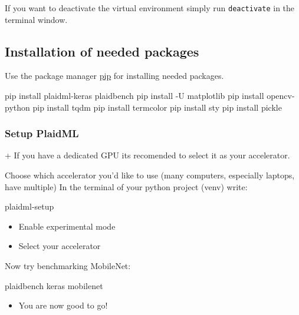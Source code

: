 \documentclass[
]{article}
\newenvironment{Shaded}{}{}
\newcommand{\ExtensionTok}[1]{#1}
\newcommand{\NormalTok}[1]{#1}
\newcommand{\VariableTok}[1]{\textcolor[rgb]{0.10,0.09,0.49}{#1}}
\providecommand{\tightlist}{%
  \setlength{\itemsep}{0pt}\setlength{\parskip}{0pt}}
\begin{document}
If you want to deactivate the virtual environment simply run
\texttt{deactivate} in the terminal window.

\hypertarget{installation-of-needed-packages}{%
\subsection{Installation of needed
packages}\label{installation-of-needed-packages}}

Use the package manager \href{https://pip.pypa.io/en/stable/}{pip} for
installing needed packages.

\begin{Shaded}
\begin{Highlighting}[]
\ExtensionTok{pip}\NormalTok{ install plaidml{-}keras plaidbench}
\ExtensionTok{pip}\NormalTok{ install {-}U matplotlib}
\ExtensionTok{pip}\NormalTok{ install opencv{-}python}
\ExtensionTok{pip}\NormalTok{ install tqdm}
\ExtensionTok{pip}\NormalTok{ install termcolor}
\ExtensionTok{pip}\NormalTok{ install sty}
\ExtensionTok{pip}\NormalTok{ install pickle}
\end{Highlighting}
\end{Shaded}

\hypertarget{setup-plaidml}{%
\subsubsection{Setup PlaidML}\label{setup-plaidml}}

\begin{Shaded}
\begin{Highlighting}[]
\VariableTok{+ If you have a dedicated GPU its recomended to select it as your accelerator.}
\end{Highlighting}
\end{Shaded}

Choose which accelerator you'd like to use (many computers, especially
laptops, have multiple) In the terminal of your python project (venv)
write:

\begin{Shaded}
\begin{Highlighting}[]
\ExtensionTok{plaidml{-}setup}
\end{Highlighting}
\end{Shaded}

\begin{itemize}
\tightlist
\item
  Enable experimental mode
\item
  Select your accelerator
\end{itemize}

Now try benchmarking MobileNet:

\begin{Shaded}
\begin{Highlighting}[]
\ExtensionTok{plaidbench}\NormalTok{ keras mobilenet}
\end{Highlighting}
\end{Shaded}

\begin{itemize}
\tightlist
\item
  You are now good to go!
\end{itemize}
\end{document}
